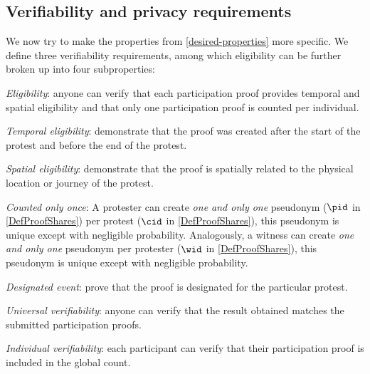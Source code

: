 \subsection{Verifiability and privacy requirements}%
\label{verifiability-properties}

We now try to make the properties from \cref{desired-properties} more 
specific.
We define three verifiability requirements, among which eligibility can be 
further broken up into four subproperties:
\begin{requirements}[V]
  \item\label{EligibilityVerif} \emph{Eligibility}: anyone can verify that each participation proof provides temporal and spatial eligibility and that only one participation proof is counted per individual.
    \begin{requirements}

    \item\label{TemporallyRelated} \emph{Temporal eligibility}: demonstrate that the proof was created after the start of the protest and before the end of the protest.

    \item\label{SpatiallyRelated} \emph{Spatial eligibility}: demonstrate that the proof is spatially related to the physical location or journey of the protest.

    \item\label{CountOnce} \emph{Counted only once}:
      A protester can create \emph{one and only one} pseudonym (\(\pid\) in 
      \cref{DefProofShares}) per protest (\(\cid\) in \cref{DefProofShares}), 
      this pseudonym is unique except with negligible probability.
      Analogously, a witness can create \emph{one and only one} pseudonym per 
      protester (\(\wid\) in \cref{DefProofShares}), this pseudonym is unique 
      except with negligible probability.

    \item\label{DesignatedEvent} \emph{Designated event}: prove that the proof 
      is designated for the particular protest.

    \end{requirements}

  \item\label{UniversalVerif} \emph{Universal verifiability}: anyone can verify that the result obtained matches the submitted participation proofs.

  \item\label{IndividualVerif} \emph{Individual verifiability}: each participant can verify that their participation proof is included in the global count.
\end{requirements}

